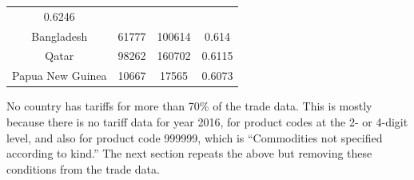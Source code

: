 \documentclass[10pt,]{article}
\begin{document}
\begin{longtable}[]{@{}cccc@{}}
\begin{minipage}[t]{0.18\columnwidth}
0.6246\strut
\end{minipage}\tabularnewline
\begin{minipage}[t]{0.26\columnwidth}\centering\strut
Bangladesh\strut
\end{minipage} & \begin{minipage}[t]{0.12\columnwidth}\centering\strut
61777\strut
\end{minipage} & \begin{minipage}[t]{0.10\columnwidth}\centering\strut
100614\strut
\end{minipage} & \begin{minipage}[t]{0.18\columnwidth}\centering\strut
0.614\strut
\end{minipage}\tabularnewline
\begin{minipage}[t]{0.26\columnwidth}\centering\strut
Qatar\strut
\end{minipage} & \begin{minipage}[t]{0.12\columnwidth}\centering\strut
98262\strut
\end{minipage} & \begin{minipage}[t]{0.10\columnwidth}\centering\strut
160702\strut
\end{minipage} & \begin{minipage}[t]{0.18\columnwidth}\centering\strut
0.6115\strut
\end{minipage}\tabularnewline
\begin{minipage}[t]{0.26\columnwidth}\centering\strut
Papua New Guinea\strut
\end{minipage} & \begin{minipage}[t]{0.12\columnwidth}\centering\strut
10667\strut
\end{minipage} & \begin{minipage}[t]{0.10\columnwidth}\centering\strut
17565\strut
\end{minipage} & \begin{minipage}[t]{0.18\columnwidth}\centering\strut
0.6073\strut
\end{minipage}\tabularnewline
\bottomrule
\end{longtable}

No country has tariffs for more than 70\% of the trade data. This is
mostly because there is no tariff data for year 2016, for product codes
at the 2- or 4-digit level, and also for product code 999999, which is
``Commodities not specified according to kind.'' The next section
repeats the above but removing these conditions from the trade data.
\end{document}
